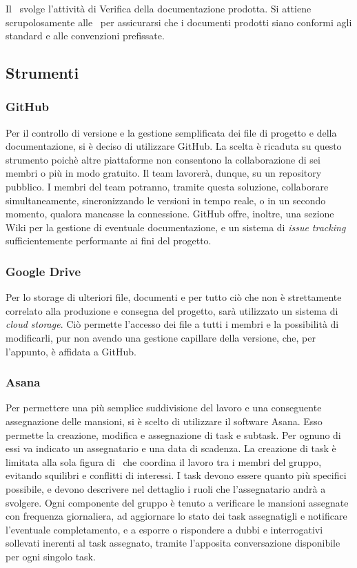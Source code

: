 		\subsubsection{\Ver}
		Il \Ver\ svolge l'attività di Verifica della documentazione prodotta. Si attiene scrupolosamente alle \NdP\ per assicurarsi che i documenti prodotti siano conformi agli standard e alle convenzioni prefissate.

	\subsection{Strumenti}

		\subsubsection{GitHub}
		Per il controllo di versione e la gestione semplificata dei file di progetto e della documentazione, si è deciso di utilizzare GitHub. La scelta è ricaduta su questo strumento poichè altre piattaforme non consentono la collaborazione di sei membri o più in modo gratuito. Il team lavorerà, dunque, su un repository pubblico. I membri del team potranno, tramite questa soluzione, collaborare simultaneamente, sincronizzando le versioni in tempo reale, o in un secondo momento, qualora mancasse la connessione. GitHub offre, inoltre, una sezione Wiki per la gestione di eventuale documentazione, e un sistema di \textit{issue tracking} sufficientemente performante ai fini del progetto.

		\subsubsection{Google Drive}
		Per lo storage di ulteriori file, documenti e per tutto ciò che non è strettamente correlato alla produzione e consegna del progetto, sarà utilizzato un sistema di \textit{cloud storage}. Ciò permette l'accesso dei file a tutti i membri e la possibilità di modificarli, pur non avendo una gestione capillare della versione, che, per l'appunto, è affidata a GitHub.

		\subsubsection{Asana}
		Per permettere una più semplice suddivisione del lavoro e una conseguente assegnazione delle mansioni, si è scelto di utilizzare il software Asana. Esso permette la creazione, modifica e assegnazione di task e subtask. Per ognuno di essi va indicato un assegnatario e una data di scadenza. La creazione di task è limitata alla sola figura di \RdP\, che coordina il lavoro tra i membri del gruppo, evitando squilibri e conflitti di interessi. I task devono essere quanto più specifici possibile, e devono descrivere nel dettaglio i ruoli che l'assegnatario andrà a svolgere. Ogni componente del gruppo è tenuto a verificare le mansioni assegnate con frequenza giornaliera, ad aggiornare lo stato dei task assegnatigli e notificare l'eventuale completamento, e a esporre o rispondere a dubbi e interrogativi sollevati inerenti al task assegnato, tramite l'apposita conversazione disponibile per ogni singolo task.